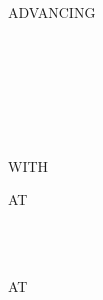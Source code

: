 \begin{syntax}
  \begin{1=}
    \recordname
    \begin{0-1}
      \begin{1=}
        \identifier \\
        \literal \\
        \functionname
      \end{1=}
    \end{0-1} \\

     \filename {}
    \begin{1=}
      \identifier \\
      \literal \\
      \functionname
    \end{1=}
  \end{1=}

  \begin{0-1}
    \begin{1=}
       \\
    \end{1=}
    ADVANCING
    \begin{1=}
      \begin{1=}
        \identifier \\
        \literal
      \end{1=}
      \begin{0-1}
         \\
      \end{0-1} \\

      \mnemonicname \\

    \end{1=}
  \end{0-1}

  \begin{0-1}
  \end{0-1}
  \begin{0-1}
    WITH
    \begin{0-1}
    \end{0-1}
  \end{0-1}

  \begin{0+}
    AT
    \begin{1=}
       \\
    \end{1=}
    \imperativestatement \\

     AT
    \begin{1=}
       \\
    \end{1=}
    \imperativestatement
  \end{0+}

  \begin{0-1}
  \end{0-1}
\end{syntax}


